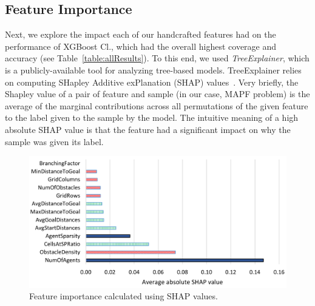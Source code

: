 \documentclass[letterpaper]{article} %
\begin{document}
\subsection{Feature Importance}
Next, we explore the impact each of our handcrafted features had on the performance of XGBoost Cl., which had the overall highest coverage and accuracy (see Table~\ref{table:allResults}). 
To this end, we used \emph{TreeExplainer}, which is a publicly-available tool for analyzing tree-based models. %
TreeExplainer relies on computing SHapley Additive exPlanation (SHAP) values~\cite{lundberg2017unified}. 
Very briefly, the Shapley value of a pair of feature and sample (in our case, MAPF problem) is the average of the marginal contributions across all permutations of the given feature to the label given to the sample by the model. 
The intuitive meaning of a high absolute SHAP value is that the feature had a significant impact on why the sample was given its label. 


\begin{figure}[t]
    \centering
    \includegraphics[width=\columnwidth]{shap-values-cropped.pdf}
    \caption{Feature importance calculated using SHAP values.} 
    \label{fig:FeatureImportance}
\end{figure}
\end{document}
